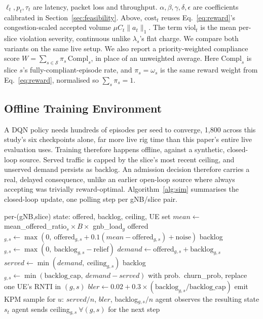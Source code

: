 \documentclass[10pt]{article}
\begin{document}
$\ell_t,p_t,\tau_t$ are latency, packet loss and throughput.
$\alpha,\beta,\gamma,\delta,\epsilon$ are coefficients calibrated in
Section~\ref{sec:feasibility}. Above, $\mathrm{cost}_t$ reuses
Eq.~\eqref{eq:reward}'s congestion-scaled accepted volume
$\mu C_t\|a_t\|_1$. The term $\mathrm{viol}_t$ is the mean per-slice
violation severity, continuous unlike $\lambda_s$'s flat charge. We
compare both variants on the same live setup. We also
report a priority-weighted compliance score $W =
\sum_{s\in\mathcal{S}} \pi_s\,\mathrm{Compl}_s$, in place of an
unweighted average. Here $\mathrm{Compl}_s$ is slice $s$'s
fully-compliant-episode rate, and $\pi_s = \omega_s$ is the same
reward weight from Eq.~\eqref{eq:reward}, normalised so
$\sum_s \pi_s=1$.

\subsection{Offline Training Environment}
\label{sec:offline-env}
A DQN policy needs hundreds of episodes per seed to converge, 1,800
across this study's six checkpoints alone, far more live rig time
than this paper's entire live evaluation uses. Training therefore
happens offline, against a synthetic, closed-loop source. Served
traffic is capped by the slice's most recent ceiling, and unserved
demand persists as backlog. An admission decision therefore carries a
real, delayed consequence, unlike an earlier open-loop source where
always accepting was trivially reward-optimal. Algorithm~\ref{alg:sim}
summarises the closed-loop update, one polling step per gNB/slice
pair.

\begin{algorithm}[t]
\caption{Offline closed-loop 5G traffic simulation (one polling step, all gNBs/slices)}
\label{alg:sim}
\footnotesize
\begin{algorithmic}[1]
\REQUIRE per-(gNB,slice) state: offered, backlog, ceiling, UE set
  \STATE $mean \gets$ mean\_offered\_ratio$_s \times B \times$ gnb\_load$_g$
  \STATE offered$_{g,s} \gets \max(0,\ \text{offered}_{g,s} + 0.1(mean - \text{offered}_{g,s}) + \text{noise})$
    \STATE backlog$_{g,s} \gets \max(0,\ \text{backlog}_{g,s} - \text{relief})$
  \ENDIF
  \STATE $demand \gets \text{offered}_{g,s} + \text{backlog}_{g,s}$
  \STATE $served \gets \min(demand,\ \text{ceiling}_{g,s})$
  \STATE backlog$_{g,s} \gets \min(\text{backlog\_cap},\ demand - served)$
  \STATE with prob.\ churn\_prob, replace one UE's RNTI in $(g,s)$
  \STATE $bler \gets 0.02 + 0.3 \times (\text{backlog}_{g,s} / \text{backlog\_cap})$
    \STATE emit KPM sample for $u$: $served/n$, $bler$, backlog$_{g,s}/n$
  \ENDFOR
\ENDFOR
\STATE agent observes the resulting state $s_t$
\STATE agent sends ceiling$_{g,s}\ \forall (g,s)$ for the next step
\end{algorithmic}
\end{algorithm}
\end{document}
